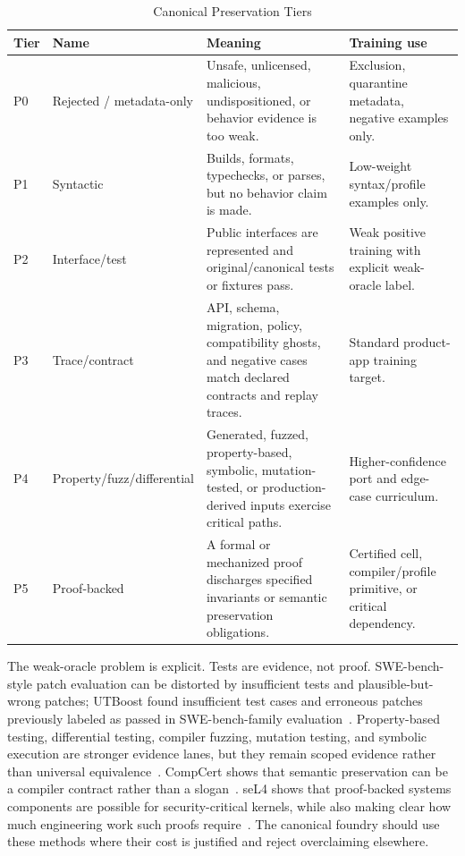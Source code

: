 \begin{table}[t]
\caption{Canonical Preservation Tiers}
\label{tab:preservationtiers}
\centering
\footnotesize
\begin{tabularx}{\textwidth}{p{}p{}X X}
\toprule
Tier & Name & Meaning & Training use \\
\midrule
P0 & Rejected / metadata-only & Unsafe, unlicensed, malicious, undispositioned, or behavior evidence is too weak. & Exclusion, quarantine metadata, negative examples only. \\
P1 & Syntactic & Builds, formats, typechecks, or parses, but no behavior claim is made. & Low-weight syntax/profile examples only. \\
P2 & Interface/test & Public interfaces are represented and original/canonical tests or fixtures pass. & Weak positive training with explicit weak-oracle label. \\
P3 & Trace/contract & API, schema, migration, policy, compatibility ghosts, and negative cases match declared contracts and replay traces. & Standard product-app training target. \\
P4 & Property/fuzz/differential & Generated, fuzzed, property-based, symbolic, mutation-tested, or production-derived inputs exercise critical paths. & Higher-confidence port and edge-case curriculum. \\
P5 & Proof-backed & A formal or mechanized proof discharges specified invariants or semantic preservation obligations. & Certified cell, compiler/profile primitive, or critical dependency. \\
\bottomrule
\end{tabularx}
\end{table}

The weak-oracle problem is explicit. Tests are evidence, not proof. SWE-bench-style patch evaluation can be distorted by insufficient tests and plausible-but-wrong patches; UTBoost found insufficient test cases and erroneous patches previously labeled as passed in SWE-bench-family evaluation~\cite{utboost}. Property-based testing, differential testing, compiler fuzzing, mutation testing, and symbolic execution are stronger evidence lanes, but they remain scoped evidence rather than universal equivalence~\cite{quickcheck,csmith,mutationTesting,kleeOSDI}. CompCert shows that semantic preservation can be a compiler contract rather than a slogan~\cite{compcertManual}. seL4 shows that proof-backed systems components are possible for security-critical kernels, while also making clear how much engineering work such proofs require~\cite{sel4Proofs}. The canonical foundry should use these methods where their cost is justified and reject overclaiming elsewhere.

